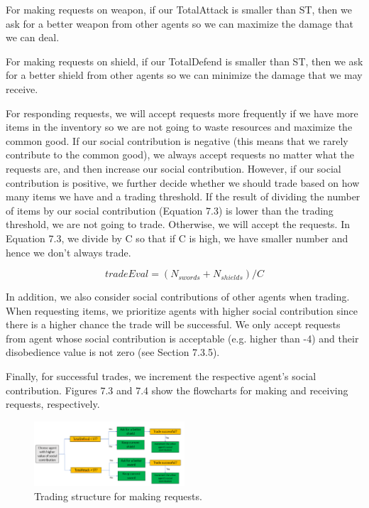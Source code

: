\par For making requests on weapon, if our TotalAttack is smaller than ST, then we ask for a better weapon from other agents so we can maximize the damage that we can deal.

\par For making requests on shield, if our TotalDefend is smaller than ST, then we ask for a better shield from other agents so we can minimize the damage that we may receive.

\par For responding requests, we will accept requests more frequently if we have more items in the inventory so we are not going to waste resources and maximize the common good. If our social contribution is negative (this means that we rarely contribute to the common good), we always accept requests no matter what the requests are, and then increase our social contribution. However, if our social contribution is positive, we further decide whether we should trade based on how many items we have and a trading threshold. If the result of dividing the number of items by our social contribution (Equation 7.3) is lower than the trading threshold, we are not going to trade. Otherwise, we will accept the requests. In Equation 7.3, we divide by C so that if C is high, we have smaller number and hence we don't always trade.

\begin{equation}  
tradeEval = (N_{swords} + N_{shields}) / C
\label{eq:equation}
\end{equation}

\par In addition, we also consider social contributions of other agents when trading. When requesting items, we prioritize agents with higher social contribution since there is a higher chance the trade will be successful. We only accept requests from agent whose social contribution is acceptable (e.g. higher than -4) and their disobedience value is not zero (see Section 7.3.5).

\par Finally, for successful trades, we increment the respective agent's social contribution. Figures 7.3 and 7.4 show the flowcharts for making and receiving requests, respectively.

\begin{figure}
    \centering
    \includegraphics[width=0.5\textwidth]{007_team_4_agent_design/figures/4_trading_make.png}
    \caption{Trading structure for making requests.}
    \label{fig:proj_struct}
\end{figure}

